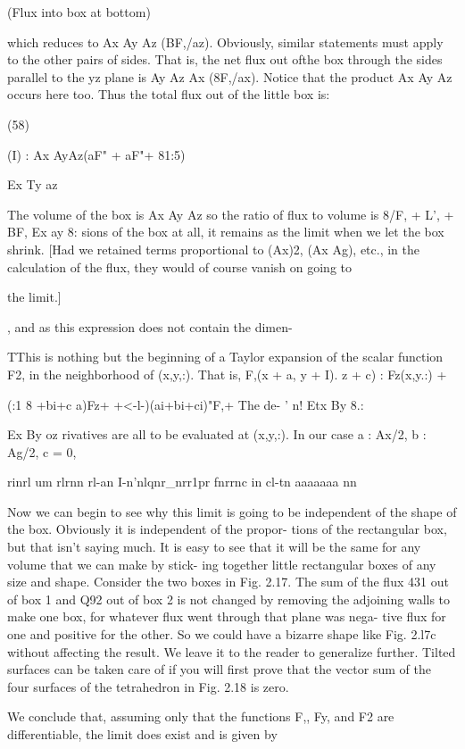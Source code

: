(Flux into box at bottom)

which reduces to Ax Ay Az (BF,/az). Obviously, similar statements
must apply to the other pairs of sides. That is, the net flux out ofthe
box through the sides parallel to the yz plane is Ay Az Ax (8F,/ax).
Notice that the product Ax Ay Az occurs here too. Thus the total
flux out of the little box is:

(58)

(I) : Ax AyAz(aF" + aF"+ 81:5)

Ex Ty az

The volume of the box is Ax Ay Az so the ratio of flux to volume is
8/F, + L', + BF,
Ex ay 8:
sions of the box at all, it remains as the limit when we let the box
shrink. [Had we retained terms proportional to (Ax)2, (Ax Ag), etc.,
in the calculation of the flux, they would of course vanish on going to

the limit.]

, and as this expression does not contain the dimen-

TThis is nothing but the beginning of a Taylor expansion of the scalar function F2,
in the neighborhood of (x,y,:). That is, F,(x + a, y + I). z + c) : Fz(x,y.:) +

(:1 8 +bi+c a)Fz+  +<-l-)(ai+bi+ci)"F,+  The de-
' n! Etx By 8.:

Ex By oz
rivatives are all to be evaluated at (x,y,:). In our case a : Ax/2, b : Ag/2, c = 0,

rinrl um rlrnn rl-an I-n'nlqnr_nrr1pr fnrrnc in cl-tn aaaaaaa nn

Now we can begin to see why this limit is going to be independent
of the shape of the box. Obviously it is independent of the propor-
tions of the rectangular box, but that isn't saying much. It is easy to
see that it will be the same for any volume that we can make by stick-
ing together little rectangular boxes of any size and shape. Consider
the two boxes in Fig. 2.17. The sum of the flux 431 out of box 1 and
Q92 out of box 2 is not changed by removing the adjoining walls to
make one box, for whatever flux went through that plane was nega-
tive flux for one and positive for the other. So we could have a
bizarre shape like Fig. 2.l7c without affecting the result. We leave it
to the reader to generalize further. Tilted surfaces can be taken care
of if you will first prove that the vector sum of the four surfaces of the
tetrahedron in Fig. 2.18 is zero.

We conclude that, assuming only that the functions F,, Fy, and F2
are differentiable, the limit does exist and is given by

